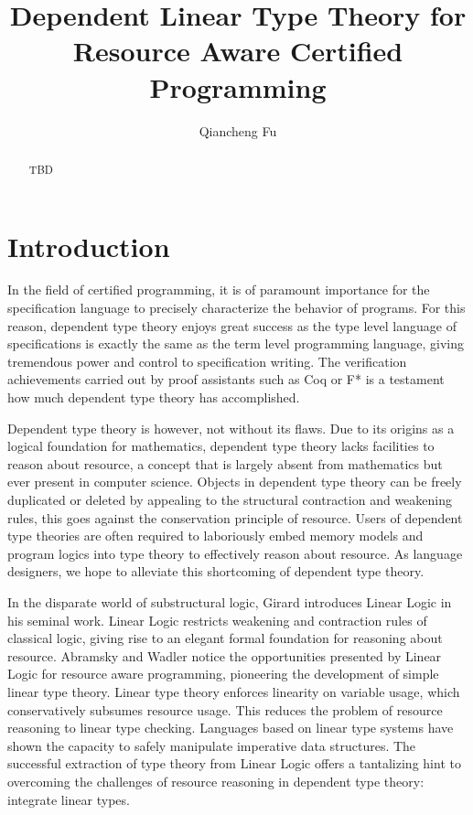\documentclass{article}
\title{Dependent Linear Type Theory for Resource Aware Certified Programming}
\author{Qiancheng Fu}
\begin{document}
  \maketitle 
  \begin{abstract}
    TBD
  \end{abstract}

  \section{Introduction}
  In the field of certified programming, it is of paramount importance for the specification language to precisely characterize the behavior of programs. For this reason, dependent type theory enjoys great success as the type level language of specifications is exactly the same as the term level programming language, giving tremendous power and control to specification writing. The verification achievements carried out by proof assistants such as Coq or F* is a testament how much dependent type theory has accomplished. 
  
  Dependent type theory is however, not without its flaws. Due to its origins as a logical foundation for mathematics, dependent type theory lacks facilities to reason about resource, a concept that is largely absent from mathematics but ever present in computer science. Objects in dependent type theory can be freely duplicated or deleted by appealing to the structural contraction and weakening rules, this goes against the conservation principle of resource. Users of dependent type theories are often required to laboriously embed memory models and program logics into type theory to effectively reason about resource. As language designers, we hope to alleviate this shortcoming of dependent type theory.

  In the disparate world of substructural logic, Girard introduces Linear Logic in his seminal work. Linear Logic restricts weakening and contraction rules of classical logic, giving rise to an elegant formal foundation for reasoning about resource. Abramsky and Wadler notice the opportunities presented by Linear Logic for resource aware programming, pioneering the development of simple linear type theory. Linear type theory enforces linearity on variable usage, which conservatively subsumes resource usage. This reduces the problem of resource reasoning to linear type checking. Languages based on linear type systems have shown the capacity to safely manipulate imperative data structures. The successful extraction of type theory from Linear Logic offers a tantalizing hint to overcoming the challenges of resource reasoning in dependent type theory: integrate linear types.
\end{document}
